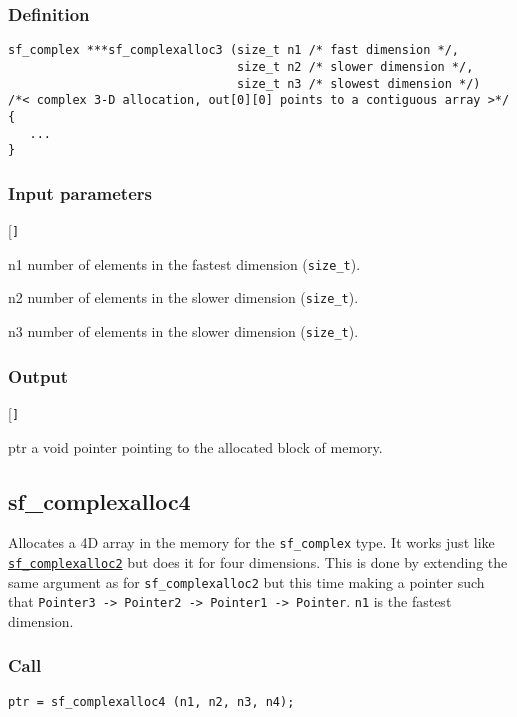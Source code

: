 \subsubsection*{Definition}
\begin{verbatim}
sf_complex ***sf_complexalloc3 (size_t n1 /* fast dimension */, 
                                size_t n2 /* slower dimension */, 
                                size_t n3 /* slowest dimension */)
/*< complex 3-D allocation, out[0][0] points to a contiguous array >*/
{
   ...
}
\end{verbatim}

\subsubsection*{Input parameters}
\begin{desclist}{\tt }{\quad}[\tt ]
   \setlength\itemsep{0pt}
   \item[n1] number of elements in the fastest dimension (\texttt{size\_t}).
   \item[n2] number of elements in the slower dimension (\texttt{size\_t}).
   \item[n3] number of elements in the slower dimension (\texttt{size\_t}).
\end{desclist}

\subsubsection*{Output}
\begin{desclist}{\tt }{\quad}[\tt ]
   \setlength\itemsep{0pt}
   \item[ptr] a void pointer pointing to the allocated block of memory.
\end{desclist}




\subsection{{sf\_complexalloc4}}
Allocates a 4D array in the memory for the  \texttt{sf\_complex} type. It works just like \hyperref[sec:sf_complexalloc2]{\texttt{sf\_complexalloc2}} but does it for four dimensions. This is done by extending the same argument as for \texttt{sf\_complexalloc2} but this time making a pointer such that \texttt{Pointer3 -> Pointer2 -> Pointer1 -> Pointer}. \texttt{n1} is the fastest dimension.

\subsubsection*{Call}
\begin{verbatim}ptr = sf_complexalloc4 (n1, n2, n3, n4);\end{verbatim}

